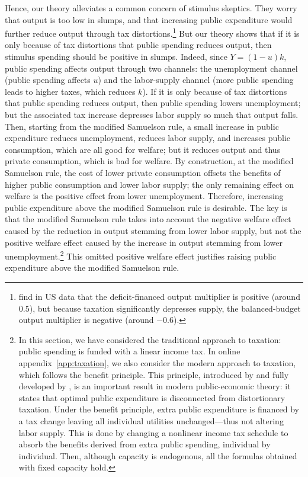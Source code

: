 \documentclass[letterpaper,12pt,leqno]{article}
\begin{document}
\begin{bibunit}
Hence, our theory alleviates a common concern of stimulus skeptics. They worry that output is too low in slumps, and that increasing public expenditure would further reduce output through tax distortions.\footnote{ find in US data that the deficit-financed output multiplier is positive (around $0.5$), but because taxation significantly depresses supply, the balanced-budget output multiplier is negative (around $-0.6$).}  But our theory shows that if it is only because of tax distortions that public spending reduces output, then stimulus spending should be positive in slumps. Indeed, since $Y = (1-u) k$, public spending affects output through two channels: the unemployment channel (public spending affects $u$) and the labor-supply channel (more public spending leads to higher taxes, which reduces $k$). If it is only because of tax distortions that public spending reduces output, then public spending lowers unemployment; but the associated tax increase depresses labor supply so much that output falls. Then, starting from the modified Samuelson rule, a small increase in public expenditure reduces unemployment, reduces labor supply, and increases public consumption, which are all good for welfare; but it reduces output and thus private consumption, which is bad for welfare. By construction, at the modified Samuelson rule, the cost of lower private consumption offsets the benefits of higher public consumption and lower labor supply; the only remaining effect on welfare is the positive effect from lower unemployment. Therefore, increasing public expenditure above the modified Samuelson rule is desirable. The key is that the modified Samuelson rule takes into account the negative welfare effect caused by the reduction in output stemming from lower labor supply, but not the positive welfare effect caused by the increase in output stemming from lower unemployment.\footnote{In this section, we have considered the traditional approach to taxation: public spending is funded with a linear income tax. In online appendix~\ref{app:taxation}, we also consider the modern approach to taxation, which follows the benefit principle. This principle, introduced by  and fully developed by , is an important result in modern public-economic theory: it states that optimal public expenditure is disconnected from distortionary taxation. Under the benefit principle, extra public expenditure is financed by a tax change leaving all individual utilities unchanged---thus not altering labor supply. This is done by changing a nonlinear income tax schedule to absorb the benefits derived from extra public spending, individual by individual. Then, although capacity is endogenous, all the formulas obtained with fixed capacity hold.} This omitted positive welfare effect justifies raising public expenditure above the modified Samuelson rule.



\end{bibunit}
\end{document}
